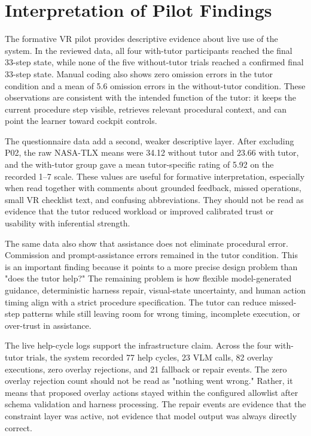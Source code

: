 \section{Interpretation of Pilot Findings}\label{sec:disc-pilot}

The formative VR pilot provides descriptive evidence about live use of the
system. In the reviewed data, all four with-tutor participants reached the
final 33-step state, while none of the five without-tutor trials reached a
confirmed final 33-step state. Manual coding also shows zero omission errors in
the tutor condition and a mean of 5.6 omission errors in the without-tutor
condition. These observations are consistent with the intended function of the
tutor: it keeps the current procedure step visible, retrieves relevant
procedural context, and can point the learner toward cockpit controls.

The questionnaire data add a second, weaker descriptive layer. After excluding
P02, the raw NASA-TLX means were 34.12 without tutor and 23.66 with tutor, and
the with-tutor group gave a mean tutor-specific rating of 5.92 on the recorded
1--7 scale. These values are useful for formative interpretation, especially
when read together with comments about grounded feedback, missed operations,
small VR checklist text, and confusing abbreviations. They should not be read
as evidence that the tutor reduced workload or improved calibrated trust or
usability with inferential strength.

The same data also show that assistance does not eliminate procedural error.
Commission and prompt-assistance errors remained in the tutor condition. This is
an important finding because it points to a more precise design problem than
"does the tutor help?" The remaining problem is how flexible model-generated
guidance, deterministic harness repair, visual-state uncertainty, and human
action timing align with a strict procedure specification. The tutor can reduce
missed-step patterns while still leaving room for wrong timing, incomplete
execution, or over-trust in assistance.

The live help-cycle logs support the infrastructure claim. Across the four
with-tutor trials, the system recorded 77 help cycles, 23 VLM calls, 82 overlay
executions, zero overlay rejections, and 21 fallback or repair events. The zero
overlay rejection count should not be read as "nothing went wrong." Rather, it
means that proposed overlay actions stayed within the configured allowlist after
schema validation and harness processing. The repair events are evidence that
the constraint layer was active, not evidence that model output was always
directly correct.

